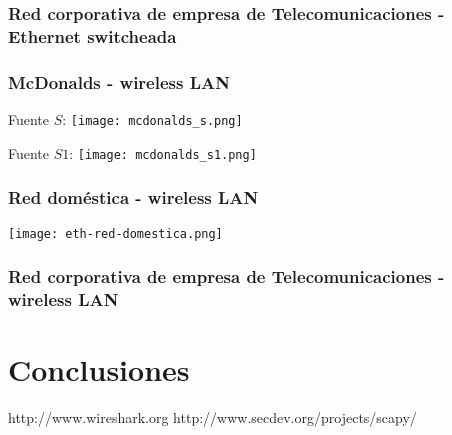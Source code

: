 \documentclass[letterpaper, 10 pt, conference]{ieeeconf}  %
\begin{document}
\subsubsection{Red corporativa de empresa de Telecomunicaciones - Ethernet switcheada}

\subsubsection{McDonalds - wireless LAN}

Fuente $S$:
\texttt{[image: mcdonalds\_s.png]}

Fuente $S1$:
\texttt{[image: mcdonalds\_s1.png]}


\subsubsection{Red doméstica - wireless LAN}
\texttt{[image: eth-red-domestica.png]}

\subsubsection{Red corporativa de empresa de Telecomunicaciones - wireless LAN}


\section{Conclusiones}



\addtolength{\textheight}{-12cm}   %




\begin{thebibliography}{99}

 http://www.wireshark.org
 http://www.secdev.org/projects/scapy/

\end{thebibliography}
\end{document}
